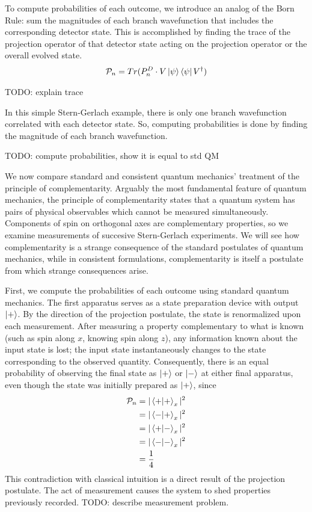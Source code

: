 To compute probabilities of each outcome, we introduce an analog of the Born Rule: sum the magnitudes of each branch wavefunction that includes the corresponding detector state. This is accomplished by finding the trace of the projection operator of that detector state acting on the projection operator or the overall evolved state.
\begin{align}
    \mathcal{P}_n = Tr(P^D_n \cdot V\ket{\psi}\bra{\psi}V^\dagger)
\end{align}

TODO: explain trace

In this simple Stern-Gerlach example, there is only one branch wavefunction correlated with each detector state. So, computing probabilities is done by finding the magnitude of each branch wavefunction.

TODO: compute probabilities, show it is equal to std QM


We now compare standard and consistent quantum mechanics' treatment of the principle of complementarity. Arguably the most fundamental feature of quantum mechanics, the principle of complementarity states that a quantum system has pairs of physical observables which cannot be measured simultaneously. Components of spin on orthogonal axes are complementary properties, so we examine measurements of succesive Stern-Gerlach experiments. We will see how complementarity is a strange consequence of the standard postulates of quantum mechanics, while in consistent formulations, complementarity is itself a postulate from which strange consequences arise.

First, we compute the probabilities of each outcome using standard quantum mechanics. The first apparatus serves as a state preparation device with output $\ket{+}$. By the direction of the projection postulate, the state is renormalized upon each measurement. After measuring a property complementary to what is known (such as spin along $x$, knowing spin along $z$), any information known about the input state is lost; the input state instantaneously changes to the state corresponding to the observed quantity. Consequently, there is an equal probability of observing the final state as $\ket{+}$ or $\ket{-}$ at either final apparatus, even though the state was initially prepared as $\ket{+}$, since
\begin{align*}
    \mathcal{P}_n &= |\braket{+|+}_x|^2 \\
                  &= |\braket{-|+}_x|^2 \\
                  &= |\braket{+|-}_x|^2 \\
                  &= |\braket{-|-}_x|^2 \\
                  &= \frac{1}{4}
\end{align*}
This contradiction with classical intuition is a direct result of the projection postulate. The act of measurement causes the system to shed properties previously recorded. TODO: describe measurement problem.

